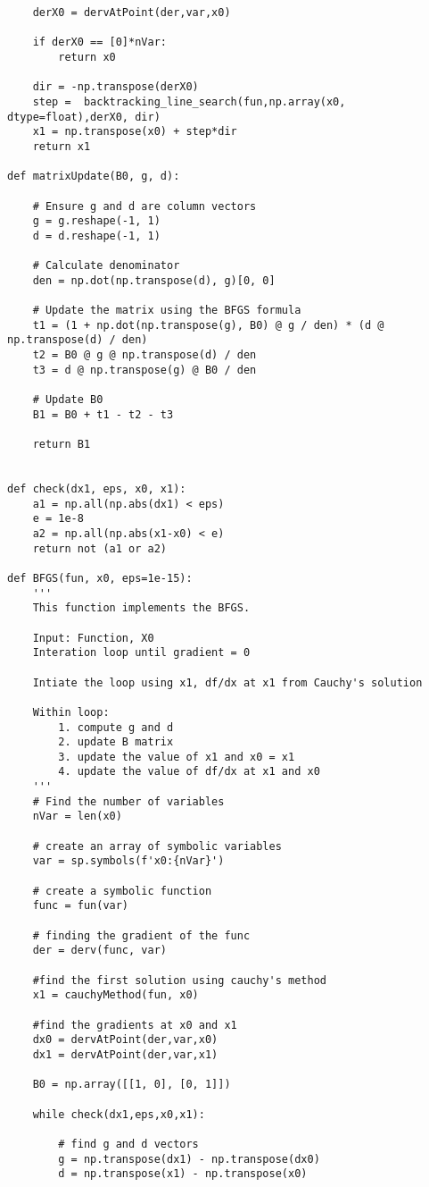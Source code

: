 \documentclass[12pt,a4paper,oneside]{paper} %
\begin{document}
\begin{verbatim}
    derX0 = dervAtPoint(der,var,x0)

    if derX0 == [0]*nVar:
        return x0
    
    dir = -np.transpose(derX0)
    step =  backtracking_line_search(fun,np.array(x0, dtype=float),derX0, dir)
    x1 = np.transpose(x0) + step*dir
    return x1

def matrixUpdate(B0, g, d):

    # Ensure g and d are column vectors
    g = g.reshape(-1, 1)  
    d = d.reshape(-1, 1) 

    # Calculate denominator
    den = np.dot(np.transpose(d), g)[0, 0] 

    # Update the matrix using the BFGS formula
    t1 = (1 + np.dot(np.transpose(g), B0) @ g / den) * (d @ np.transpose(d) / den)
    t2 = B0 @ g @ np.transpose(d) / den
    t3 = d @ np.transpose(g) @ B0 / den
    
    # Update B0
    B1 = B0 + t1 - t2 - t3

    return B1


def check(dx1, eps, x0, x1):
    a1 = np.all(np.abs(dx1) < eps)
    e = 1e-8
    a2 = np.all(np.abs(x1-x0) < e)
    return not (a1 or a2)

def BFGS(fun, x0, eps=1e-15):
    '''
    This function implements the BFGS.

    Input: Function, X0
    Interation loop until gradient = 0

    Intiate the loop using x1, df/dx at x1 from Cauchy's solution

    Within loop:
        1. compute g and d
        2. update B matrix
        3. update the value of x1 and x0 = x1
        4. update the value of df/dx at x1 and x0
    '''
    # Find the number of variables
    nVar = len(x0)

    # create an array of symbolic variables
    var = sp.symbols(f'x0:{nVar}')

    # create a symbolic function
    func = fun(var)

    # finding the gradient of the func
    der = derv(func, var)

    #find the first solution using cauchy's method
    x1 = cauchyMethod(fun, x0)

    #find the gradients at x0 and x1
    dx0 = dervAtPoint(der,var,x0)
    dx1 = dervAtPoint(der,var,x1)

    B0 = np.array([[1, 0], [0, 1]])

    while check(dx1,eps,x0,x1):

        # find g and d vectors
        g = np.transpose(dx1) - np.transpose(dx0)
        d = np.transpose(x1) - np.transpose(x0)


\end{verbatim}
\end{document}
